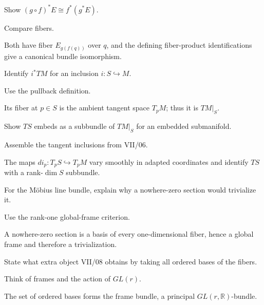 \begin{exercise}\label{exr:vii07-20}
Show \((g\circ f)^*E\cong f^*(g^*E)\).
\end{exercise}
\begin{hint}
Compare fibers.
\end{hint}
\begin{solution}
Both have fiber \(E_{g(f(q))}\) over \(q\), and the defining fiber-product identifications give a canonical bundle isomorphism.
\end{solution}

\begin{exercise}\label{exr:vii07-21}
Identify \(i^*TM\) for an inclusion \(i:S\hookrightarrow M\).
\end{exercise}
\begin{hint}
Use the pullback definition.
\end{hint}
\begin{solution}
Its fiber at \(p\in S\) is the ambient tangent space \(T_pM\); thus it is \(TM|_S\).
\end{solution}

\begin{exercise}\label{exr:vii07-22}
Show \(TS\) embeds as a subbundle of \(TM|_S\) for an embedded submanifold.
\end{exercise}
\begin{hint}
Assemble the tangent inclusions from VII/06.
\end{hint}
\begin{solution}
The maps \(di_p:T_pS\hookrightarrow T_pM\) vary smoothly in adapted coordinates and identify \(TS\) with a rank-\(\dim S\) subbundle.
\end{solution}

\begin{exercise}\label{exr:vii07-23}
For the Möbius line bundle, explain why a nowhere-zero section would trivialize it.
\end{exercise}
\begin{hint}
Use the rank-one global-frame criterion.
\end{hint}
\begin{solution}
A nowhere-zero section is a basis of every one-dimensional fiber, hence a global frame and therefore a trivialization.
\end{solution}

\begin{exercise}\label{exr:vii07-24}
State what extra object VII/08 obtains by taking all ordered bases of the fibers.
\end{exercise}
\begin{hint}
Think of frames and the action of \(GL(r)\).
\end{hint}
\begin{solution}
The set of ordered bases forms the frame bundle, a principal \(GL(r,\mathbb R)\)-bundle.
\end{solution}



